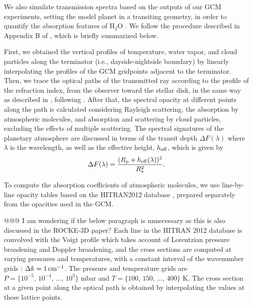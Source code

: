 \documentclass[11pt,numberedappendix,twocolappendix,]{emulateapj}
\def\water{H$_2$O }
\newcommand{\dsa}[1]{{\color{blue}#1}}
\begin{document}
We also \dsa{simulate transmission} spectra based on the outputs of \dsa{our} GCM experiments, setting the model planet in a transiting geometry, in order to quantify the absorption features of \water.  
We follow the procedure described in Appendix B of \citet{Way2017}, which is briefly summarized below. 

First, we obtained the vertical profiles of temperature, water vapor, and cloud particles along the terminator (i.e., dayside-nightside boundary) by linearly interpolating the profiles of the GCM gridpoints adjacent to the terminator. 
Then, we trace the optical paths of the transmitted ray according to the profile of the refraction index, from the observer toward the stellar disk, in the same way as described in \citet{vanderWerf2008}, following \citet{Misra2014}. 
After that, the spectral opacity at different points along the path is calculated considering Rayleigh scattering, \dsa{the absorption by atmospheric molecules, and absorption and scattering by cloud particles, excluding the effects} of multiple scattering. 
The spectral signatures of the planetary atmosphere are discussed in terms of the transit depth $\Delta F(\lambda )$ where $\lambda $ is the wavelength, as well as the effective height, $h_{\rm eff}$, which is given by
\begin{equation}
\Delta F(\lambda) = \frac{( R_{\rm p} + h_{\rm eff}(\lambda)  )^2}{R_{\star }^2}. 
\end{equation}

To compute the absorption \dsa{coefficients of} atmospheric molecules, we use line-by-line opacity tables based on \dsa{the HITRAN2012} database \citep{Rothman2013}, prepared separately from \dsa{the opacities} used in the GCM. 

\dsa{@@@ I am wondering if the below paragraph is unnecessary as this is also discussed in the ROCKE-3D paper?}
Each line in the HITRAN 2012 database is convolved with the Voigt profile which takes account of Lorentzian pressure broadening and Doppler broadening, 
and the cross sections are computed at varying pressures and temperatures, with a constant interval of the wavenumber grids : $\Delta k = 1\,{\rm cm}^{-1}$. 
The pressure and temperature grids are $P = \{10^{-5},\, 10^{-4},\,...,\,10^3\}$ mbar and $T = \{100,\, 150,\,...,\, 400\}$ K. 
The cross section at a given point along the optical path is obtained by interpolating the values at these lattice points. 
\end{document}
